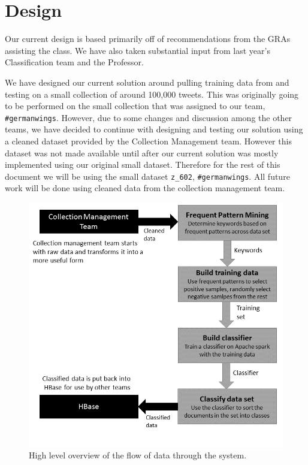 \section{Design}
Our current design is based primarily off of recommendations from the GRAs assisting the class. We have also taken substantial input from last year's Classification team \cite{cui2015classification} and the Professor.

We have designed our current solution around pulling training data from and testing on a small collection of around 100,000 tweets. This was originally going to be performed on the small collection that was assigned to our team, \texttt{\#germanwings}. However, due to some changes and discussion among the other teams, we have decided to continue with designing and testing our solution using a cleaned dataset provided by the Collection Management team. However this dataset was not made available until after our current solution was mostly implemented using our original small dataset. Therefore for the rest of this document we will be using the small dataset \texttt{z\_602}, \texttt{\#germanwings}. All future work will be done using cleaned data from the collection management team.

\begin{figure}[ht]
	\centering
	\includegraphics[scale=.65]{figures/design_flow_chart.png}
    \caption{High level overview of the flow of data through the system.}\label{fig:overview}
\end{figure}

